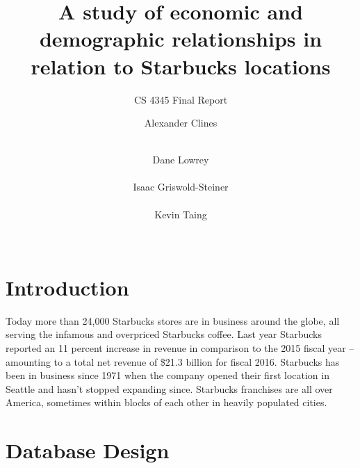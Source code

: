 \documentclass{sigkddExp}
\begin{document}
%

\title{A study of economic and demographic relationships in relation to Starbucks locations}
\subtitle{CS 4345 Final Report}


\author{
\alignauthor Alexander Clines \\
       \\
\and
\alignauthor Dane Lowrey \\
      \\
\alignauthor Isaac Griswold-Steiner \\
      \\
\alignauthor Kevin Taing \\
      \\
}
\date{}

\maketitle

\begin{abstract}
\blindtext
\end{abstract}

\section{Introduction}
Today more than 24,000 Starbucks stores are in business around the globe, all serving the infamous and overpriced Starbucks coffee.\cite{StarbucksNews}
Last year Starbucks reported an 11 percent increase in revenue in comparison to the 2015 fiscal year – amounting to a total net revenue of \$21.3 billion for fiscal 2016.\cite{StarbucksFinances}
Starbucks has been in business since 1971 when the company opened their first location in Seattle and hasn’t stopped expanding since.
Starbucks franchises are all over America, sometimes within blocks of each other in heavily populated cities.

\section{Database Design}
\blindtext
\end{document}
